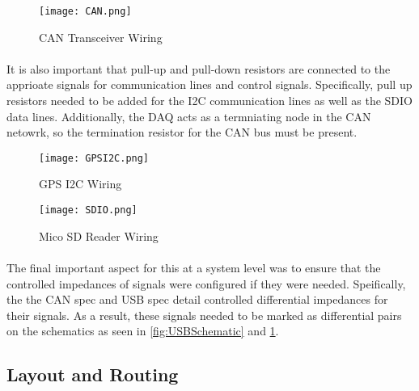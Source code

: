 \begin{figure}[H]
	\centering
	\texttt{[image: CAN.png]}
	\caption{CAN Transceiver Wiring}
	\label{fig:CANSchematic}
\end{figure}

\paragraph{}
It is also important that pull-up and pull-down resistors are connected to the apprioate signals for communication lines and control signals.
Specifically, pull up resistors needed to be added for the I2C communication lines as well as the SDIO data lines.
Additionally, the DAQ acts as a termniating node in the CAN netowrk, so the termination resistor for the CAN bus must be present.

\begin{figure}[H]
	\centering
	\texttt{[image: GPSI2C.png]}
	\caption{GPS I2C Wiring}
	\label{fig:I2CSchematic}
\end{figure}

\begin{figure}[H]
	\centering
	\texttt{[image: SDIO.png]}
	\caption{Mico SD Reader Wiring}
	\label{fig:SDSchematic}
\end{figure}

\paragraph{}
The final important aspect for this at a system level was to ensure that the controlled impedances of signals were configured if they were needed.
Speifically, the the CAN spec and USB spec detail controlled differential impedances for their signals.
As a result, these signals needed to be marked as differential pairs on the schematics as seen in \cref{fig:USBSchematic} and \cref{fig:CANSchematic}.

\subsection{Layout and Routing}

